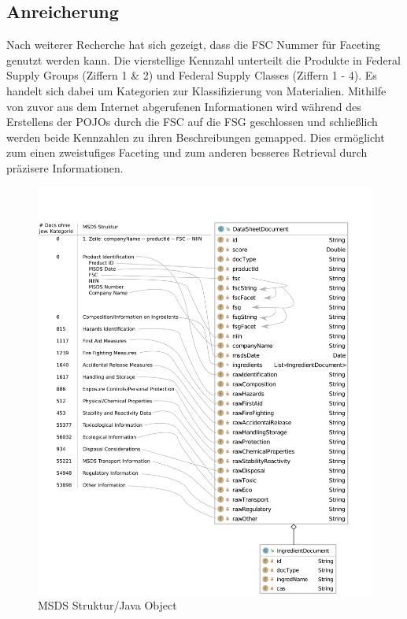 \documentclass[oneside, a4paper, 12pt, titlepage]{article}
\begin{document}
\subsection{Anreicherung}
Nach weiterer Recherche hat sich gezeigt, dass die FSC Nummer für Faceting genutzt werden kann. Die vierstellige Kennzahl unterteilt die Produkte in Federal Supply Groups (Ziffern 1 \& 2) und Federal Supply Classes (Ziffern 1 - 4). Es handelt sich dabei um Kategorien zur Klassifizierung von Materialien. Mithilfe von zuvor aus dem Internet abgerufenen Informationen wird während des Erstellens der POJOs durch die FSC auf die FSG geschlossen und schließlich werden beide Kennzahlen zu ihren Beschreibungen gemapped. Dies ermöglicht zum einen zweistufiges Faceting und zum anderen besseres Retrieval durch präzisere Informationen.
\begin{figure}[!p]
\centering
\caption{MSDS Struktur/Java Object} \label{dia1}
\includegraphics[scale=0.9]{dia1b.png}
\end{figure}
\pagebreak
\end{document}
